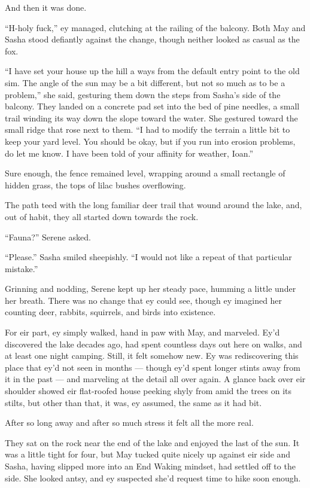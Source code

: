 And then it was done.

``H-holy fuck,'' ey managed, clutching at the railing of the balcony. Both May and Sasha stood defiantly against the change, though neither looked as casual as the fox.

``I have set your house up the hill a ways from the default entry point to the old sim. The angle of the sun may be a bit different, but not so much as to be a problem,'' she said, gesturing them down the steps from Sasha's side of the balcony. They landed on a concrete pad set into the bed of pine needles, a small trail winding its way down the slope toward the water. She gestured toward the small ridge that rose next to them. ``I had to modify the terrain a little bit to keep your yard level. You should be okay, but if you run into erosion problems, do let me know. I have been told of your affinity for weather, Ioan.''

Sure enough, the fence remained level, wrapping around a small rectangle of hidden grass, the tops of lilac bushes overflowing.

The path teed with the long familiar deer trail that wound around the lake, and, out of habit, they all started down towards the rock.

``Fauna?'' Serene asked.

``Please.'' Sasha smiled sheepishly. ``I would not like a repeat of that particular mistake.''

Grinning and nodding, Serene kept up her steady pace, humming a little under her breath. There was no change that ey could see, though ey imagined her counting deer, rabbits, squirrels, and birds into existence.

For eir part, ey simply walked, hand in paw with May, and marveled. Ey'd discovered the lake decades ago, had spent countless days out here on walks, and at least one night camping. Still, it felt somehow new. Ey was rediscovering this place that ey'd not seen in months — though ey'd spent longer stints away from it in the past — and marveling at the detail all over again. A glance back over eir shoulder showed eir flat-roofed house peeking shyly from amid the trees on its stilts, but other than that, it was, ey assumed, the same as it had bit.

After so long away and after so much stress it felt all the more real.

They sat on the rock near the end of the lake and enjoyed the last of the sun. It was a little tight for four, but May tucked quite nicely up against eir side and Sasha, having slipped more into an End Waking mindset, had settled off to the side. She looked antsy, and ey suspected she'd request time to hike soon enough.

